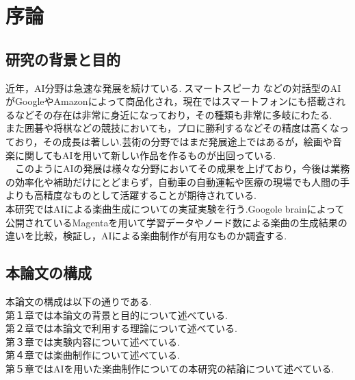\chapter{序論}
\section{研究の背景と目的}
近年，AI分野は急速な発展を続けている.スマートスピーカなどの対話型のAIがGoogleやAmazonによって商品化され，現在ではスマートフォンにも搭載されるなどその存在は非常に身近になっており，その種類も非常に多岐にわたる.\\
また囲碁や将棋などの競技においても，プロに勝利するなどその精度は高くなっており，その成長は著しい.芸術の分野ではまだ発展途上ではあるが，絵画や音楽に関してもAIを用いて新しい作品を作るものが出回っている.\\
　このようにAIの発展は様々な分野においてその成果を上げており，今後は業務の効率化や補助だけにとどまらず，自動車の自動運転や医療の現場でも人間の手よりも高精度なものとして活躍することが期待されている.\\
本研究ではAIによる楽曲生成についての実証実験を行う.Googole brainによって公開されているMagentaを用いて学習データやノード数による楽曲の生成結果の違いを比較，検証し，AIによる楽曲制作が有用なものか調査する.\\
\section{本論文の構成}
本論文の構成は以下の通りである.\\
第１章では本論文の背景と目的について述べている.\\
第２章では本論文で利用する理論について述べている.\\
第３章では実験内容について述べている.\\
第４章では楽曲制作について述べている.\\
第５章ではAIを用いた楽曲制作についての本研究の結論について述べている.\\
